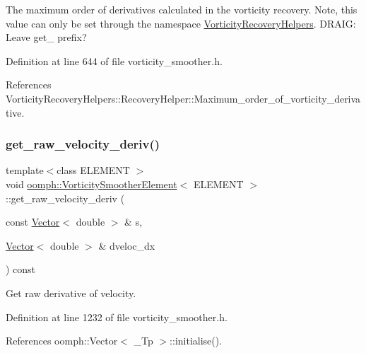The maximum order of derivatives calculated in the vorticity recovery. Note, this value can only be set through the namespace \hyperlink{namespaceVorticityRecoveryHelpers}{Vorticity\+Recovery\+Helpers}. D\+R\+A\+IG\+: Leave get\+\_\+ prefix? 



Definition at line 644 of file vorticity\+\_\+smoother.\+h.



References Vorticity\+Recovery\+Helpers\+::\+Recovery\+Helper\+::\+Maximum\+\_\+order\+\_\+of\+\_\+vorticity\+\_\+derivative.

\mbox{\label{classoomph_1_1VorticitySmootherElement_a84d1f43fd70f0c44c009bdb971e12cf7}} 
\subsubsection{\texorpdfstring{get\+\_\+raw\+\_\+velocity\+\_\+deriv()}{get\_raw\_velocity\_deriv()}\hspace{0.1cm}{\footnotesize\ttfamily [1/2]}}
{\footnotesize\ttfamily template$<$class E\+L\+E\+M\+E\+NT $>$ \\
void \hyperlink{classoomph_1_1VorticitySmootherElement}{oomph\+::\+Vorticity\+Smoother\+Element}$<$ E\+L\+E\+M\+E\+NT $>$\+::get\+\_\+raw\+\_\+velocity\+\_\+deriv (\begin{DoxyParamCaption}\item[{const \hyperlink{classoomph_1_1Vector}{Vector}$<$ double $>$ \&}]{s,  }\item[{\hyperlink{classoomph_1_1Vector}{Vector}$<$ double $>$ \&}]{dveloc\+\_\+dx }\end{DoxyParamCaption}) const\hspace{0.3cm}{\ttfamily [inline]}}



Get raw derivative of velocity. 



Definition at line 1232 of file vorticity\+\_\+smoother.\+h.



References oomph\+::\+Vector$<$ \+\_\+\+Tp $>$\+::initialise().

